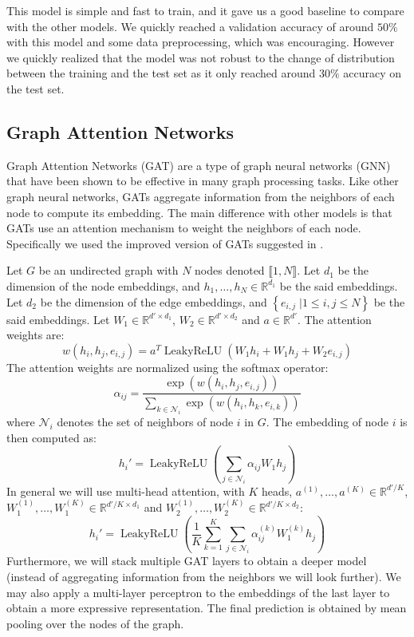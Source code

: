 \documentclass[switch, 11pt]{article}
\DeclareMathOperator{\leakyrelu}{LeakyReLU}
\newcommand{\R}{\mathbb{R}}
\begin{document}
\begin{multicols}{2}
    This model is simple and fast to train, and it gave us a good baseline to compare with the other models. We quickly reached a validation accuracy of around $50\%$ with this model and some data preprocessing, which was encouraging. However we quickly realized that the model was not robust to the change of distribution between the training and the test set as it only reached around $30\%$ accuracy on the test set.

    \subsection{Graph Attention Networks}

    Graph Attention Networks (GAT) \cite{velickovic-2018} are a type of graph neural networks (GNN) that have been shown to be effective in many graph processing tasks. Like other graph neural networks, GATs aggregate information from the neighbors of each node to compute its embedding. The main difference with other models is that GATs use an attention mechanism to weight the neighbors of each node. Specifically we used the improved version of GATs suggested in \cite{brody-2021}.

    Let $G$ be an undirected graph with $N$ nodes denoted $\llbracket1, N\rrbracket$. Let $d_1$ be the dimension of the node embeddings, and $h_1,\dots,h_N\in\R^{d_1}$ be the said embeddings. Let $d_2$ be the dimension of the edge embeddings, and $\left\{e_{i,j} \; | 1\leq i,j\leq N\right\}$ be the said embeddings. Let $W_1\in\R^{d'\times d_1}$, $W_2\in\R^{d'\times d_2}$ and $a\in\R^{d'}$. The attention weights are:
    \begin{equation}
        w(h_i,h_j, e_{i,j}) = a^T \leakyrelu(W_1h_i + W_1h_j + W_2e_{i,j})
    \end{equation}
    The attention weights are normalized using the softmax operator:
    \begin{equation}
        \alpha_{ij} = \frac{\exp(w(h_i,h_j, e_{i,j}))}{\sum_{k\in\mathcal{N}_i}\exp(w(h_i,h_k, e_{i,k}))}
    \end{equation}
    where $\mathcal{N}_i$ denotes the set of neighbors of node $i$ in $G$. The embedding of node $i$ is then computed as:
    \begin{equation}
        h_i' = \leakyrelu\left(\sum_{j\in\mathcal{N}_i}\alpha_{ij}W_1h_j\right)
    \end{equation}
    In general we will use multi-head attention, with $K$ heads, $a^{(1)},\dots,a^{(K)}\in\R^{d'/K}$, $W_1^{(1)},\dots,W_1^{(K)}\in\R^{d'/K\times d_1}$ and $W_2^{(1)},\dots,W_2^{(K)}\in\R^{d'/K\times d_2}$:
    \begin{equation}
        h_i' = \leakyrelu\left(\frac{1}{K}\sum_{k=1}^K\sum_{j\in\mathcal{N}_i}\alpha_{ij}^{(k)}W_1^{(k)}h_j\right)
    \end{equation}
    Furthermore, we will stack multiple GAT layers to obtain a deeper model (instead of aggregating information from the neighbors we will look further). We may also apply a multi-layer perceptron to the embeddings of the last layer to obtain a more expressive representation. The final prediction is obtained by mean pooling over the nodes of the graph.


\end{multicols}
\end{document}
